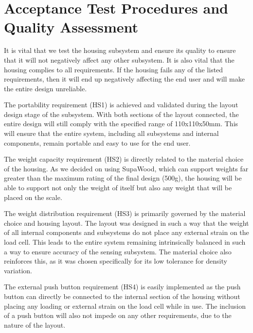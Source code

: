 \documentclass[class=report,11pt,crop=false]{standalone}
\begin{document}
\section{Acceptance Test Procedures and Quality Assessment}
It is vital that we test the housing subsystem and ensure its quality to ensure that it will not negatively affect any other subsystem. It is also vital that the housing complies to all requirements. If the housing fails any of the listed requirements, then it will end up negatively affecting the end user and will make the entire design unreliable. 

The portability requirement (HS1) is achieved and validated during the layout design stage of the subsystem. With both sections of the layout connected, the entire design will still comply with the specified range of 110x110x50mm. This will ensure that the entire system, including all subsystems and internal components, remain portable and easy to use for the end user.

The weight capacity requirement (HS2) is directly related to the material choice of the housing. As we decided on using SupaWood, which can support weights far greater than the maximum rating of the final design (500g), the housing will be able to support not only the weight of itself but also any weight that will be placed on the scale.

The weight distribution requirement (HS3) is primarily governed by the material choice and housing layout. The layout was designed in such a way that the weight of all internal components and subsystems do not place any external strain on the load cell. This leads to the entire system remaining intrinsically balanced in such a way to ensure accuracy of the sensing subsystem. The material choice also reinforces this, as it was chosen specifically for its low tolerance for density variation.

The external push button requirement (HS4) is easily implemented as the push button can directly be connected to the internal section of the housing without placing any loading or external strain on the load cell while in use. The inclusion of a push button will also not impede on any other requirements, due to the nature of the layout. 
\end{document}
